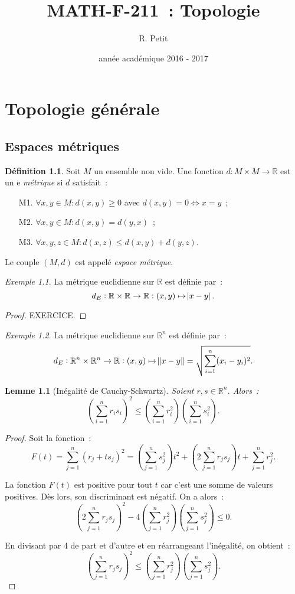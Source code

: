 \documentclass{report}
\title{MATH-F-211~: Topologie}
\author{R. Petit}
\date{année académique 2016 - 2017}
\newtheorem{lem}[thm]{Lemme}
\theoremstyle{definition}
\newtheorem{déf}[thm]{Définition}
\theoremstyle{remark}
\newtheorem{ex}{Exemple}[section]
\newcommand{\R}{\mathbb R}
\begin{document}
\maketitle
\tableofcontents
\newpage
\setcounter{page}{1}

\chapter{Topologie générale}
	\section{Espaces métriques}
		\begin{déf} Soit $M$ un ensemble non vide. Une fonction $d : M \times M \to \R$ est un e \textit{métrique} si $d$ satisfait~:
		\begin{itemize}
			\item[M1.] $\forall x, y \in M : d(x, y) \geq 0$ avec $d(x, y) = 0 \iff x = y$~;
			\item[M2.] $\forall x, y \in M : d(x, y) = d(y, x)$~;
			\item[M3.] $\forall x, y, z \in M : d(x, z) \leq d(x, y) + d(y, z)$.
		\end{itemize}

		Le couple $(M, d)$ est appelé \textit{espace métrique}.
		\end{déf}

		\begin{ex} La métrique euclidienne sur $\R$ est définie par~:
		\[d_E : \R \times \R \to \R : (x, y) \mapsto \abs {x-y}.\]
		\end{ex}

		\begin{proof} EXERCICE.
		\end{proof}

		\begin{ex}\label{ex:metriqueeuclidiennern} La métrique euclidienne sur $\R^n$ est définie par~:
		\[d_E : \R^n \times \R^n \to \R : (x, y) \mapsto \norm {x-y} = \sqrt {\sum_{i=1}^n (x_i-y_i)^2}.\]
		\end{ex}

		\begin{lem}[Inégalité de Cauchy-Schwartz] Soient $r, s \in \R^n$. Alors~:
		\[\left(\sum_{i=1}^n r_is_i\right)^2 \leq \left(\sum_{i=1}^nr_i^2\right)\left(\sum_{i=1}^ns_i^2\right).\]
		\end{lem}

		\begin{proof} Soit la fonction~:
		\[F(t) = \sum_{j=1}^n(r_j + ts_j)^2 = \left(\sum_{j=1}^ns_j^2\right)t^2 + \left(2\sum_{j=1}^nr_js_j\right)t + \sum_{j=1}^nr_j^2.\]

		La fonction $F(t)$ est positive pour tout $t$ car c'est une somme de valeurs positives. Dès lors, son discriminant est négatif. On a alors~:
		\[\left(2\sum_{j=1}^nr_js_j\right)^2 - 4\left(\sum_{j=1}^nr_j^2\right)\left(\sum_{j=1}^ns_j^2\right) \leq 0.\]
		
		En divisant par 4 de part et d'autre et en réarrangeant l'inégalité, on obtient~:
		\[\left(\sum_{j=1}^nr_js_j\right)^2 \leq \left(\sum_{j=1}^nr_j^2\right)\left(\sum_{j=1}^ns_j^2\right).\]
		\end{proof}
\end{document}
